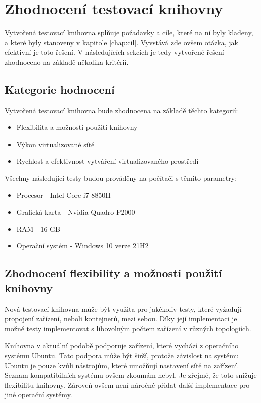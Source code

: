\chapter{Zhodnocení testovací knihovny}\label{chap:review}

Vytvořená testovací knihovna splňuje požadavky a cíle, které na ní byly kladeny, a které byly stanoveny v kapitole \ref{chap:cil}. Vyvstává zde ovšem otázka, jak efektivní je toto řešení. V následujících sekcích je tedy vytvořené řešení zhodnoceno na základě několika kritérií.

\section{Kategorie hodnocení}

Vytvořená testovací knihovna bude zhodnocena na základě těchto kategorií:

\begin{itemize}
    \item Flexibilita a možnosti použití knihovny
    \item Výkon virtualizované sítě
    \item Rychlost a efektivnost vytváření virtualizovaného prostředí
\end{itemize}

\noindent Všechny následující testy budou prováděny na počítači s těmito parametry:

\begin{itemize}
    \item Procesor - Intel Core i7-8850H
    \item Grafická karta - Nvidia Quadro P2000
    \item RAM - 16 GB
    \item Operační systém - Windows 10 verze 21H2
\end{itemize}


\section{Zhodnocení flexibility a možnosti použití knihovny}
Nová testovací knihovna může být využita pro jakékoliv testy, které vyžadují propojení zařízení, neboli kontejnerů, mezi sebou. Díky její implementaci je možné testy implementovat s libovolným počtem zařízení v různých topologiích.

Knihovna v aktuální podobě podporuje zařízení, které vychází z operačního systému Ubuntu. Tato podpora může být širší, protože závislost na systému Ubuntu je pouze kvůli nástrojům, které umožňují nastavení sítě na zařízení. Seznam kompatibilních systému ovšem zkoumám nebyl. Je zřejmé, že toto snižuje flexibilitu knihovny. Zároveň ovšem není náročné přidat další implementace pro jiné operační systémy. 

